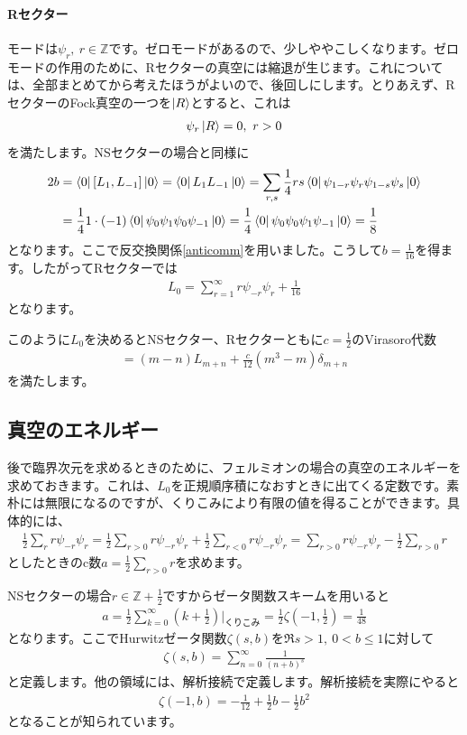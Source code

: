 \documentclass[report,paper=a4, fontsize=12pt, line_length=16cm, number_of_lines=34,dvipdfmx]{jlreq}
\numberwithin{equation}{chapter}
\numberwithin{equation}{section}
\newcommand{\Zb}{\mathbb{Z}}
\begin{document}
\paragraph{Rセクター}
モードは$\psi_{r},\ r\in \Zb$です。ゼロモードがあるので、少しややこしくなります。ゼロモードの作用のために、Rセクターの真空には縮退が生じます。これについては、全部まとめてから考えたほうがよいので、後回しにします。とりあえず、RセクターのFock真空の一つを$\ket{R}$とすると、これは
\begin{align}
  \psi_{r}\ket{R}=0,\ r>0
\end{align}
を満たします。NSセクターの場合と同様に
\begin{align}
  2b&=\bra{0}[L_{1},L_{-1}]\ket{0}
  =\bra{0}L_{1}L_{-1}\ket{0}
  =\sum_{r,s}\frac14rs\bra{0}\psi_{1-r}\psi_{r}\psi_{1-s}\psi_{s}\ket{0}\nonumber\\
  &
  =\frac14 1\cdot (-1)\bra{0}\psi_{0}\psi_{1}\psi_{0}\psi_{-1}\ket{0}
  =\frac14 \bra{0}\psi_{0}\psi_{0}\psi_{1}\psi_{-1}\ket{0}
  =\frac{1}{8}
\end{align}
となります。ここで反交換関係\eqref{anticomm}を用いました。こうして$b=\frac{1}{16}$を得ます。したがってRセクターでは
\begin{align}
  L_0=\sum_{r=1}^{\infty} r\psi_{-r}\psi_{r}
  +\frac{1}{16}
\end{align}
となります。

このように$L_0$を決めるとNSセクター、Rセクターともに$c=\frac12$のVirasoro代数
\begin{align}
  [L_m,L_n]=(m-n)L_{m+n}+\frac{c}{12}(m^3-m)\delta_{m+n}
\end{align}
を満たします。

\subsection{真空のエネルギー}
後で臨界次元を求めるときのために、フェルミオンの場合の真空のエネルギーを求めておきます。これは、$L_0$を正規順序積になおすときに出てくる定数です。素朴には無限になるのですが、くりこみにより有限の値を得ることができます。具体的には、
\begin{align}
  \frac12\sum_{r}r\psi_{-r}\psi_{r}
  =
  \frac 12 \sum_{r>0}r\psi_{-r}\psi_{r}
  +  \frac 12 \sum_{r<0}r\psi_{-r}\psi_{r}
  =\sum_{r>0}r\psi_{-r}\psi_{r}-\frac12 \sum_{r>0}r
\end{align}
としたときのc数$a=\frac12 \sum_{r>0}r$を求めます。

NSセクターの場合$r\in \Zb+\frac12$ですからゼータ関数スキームを用いると
\begin{align}
 a=\frac12 \sum_{k=0}^{\infty}(k+\frac12)\Bigg|_{\text{くりこみ}}=\frac12 \zeta(-1,\frac12)=
 \frac{1}{48}\label{aNSfermion1}
\end{align}
となります。ここでHurwitzゼータ関数$\zeta(s,b)$を$\Re s >1,\ 0< b \le 1$に対して
\begin{align}
  \zeta(s,b)=\sum_{n=0}^{\infty}\frac{1}{(n+b)^s}\label{zetafunction}
\end{align}
と定義します。他の領域には、解析接続で定義します。解析接続を実際にやると
\begin{align}
  \zeta(-1,b)=-\frac{1}{12}+\frac12 b -\frac12 b^2\label{zetavalue}
\end{align}
となることが知られています。
\end{document}
